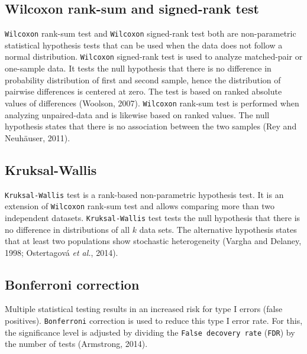 \documentclass[
  parskip,
  openany]{scrreprt}
\begin{document}
\hypertarget{wilcoxon-rank-sum-and-signed-rank-test}{%
\subsection{Wilcoxon rank-sum and signed-rank
test}\label{wilcoxon-rank-sum-and-signed-rank-test}}

\texttt{Wilcoxon} rank-sum test and \texttt{Wilcoxon} signed-rank test
both are non-parametric statistical hypothesis tests that can be used
when the data does not follow a normal distribution. \texttt{Wilcoxon}
signed-rank test is used to analyze matched-pair or one-sample data. It
tests the null hypothesis that there is no difference in probability
distribution of first and second sample, hence the distribution of
pairwise differences is centered at zero. The test is based on ranked
absolute values of differences (Woolson, 2007). \texttt{Wilcoxon}
rank-sum test is performed when analyzing unpaired-data and is likewise
based on ranked values. The null hypothesis states that there is no
association between the two samples (Rey and Neuhäuser, 2011).

\hypertarget{kruksal-wallis}{%
\subsection{Kruksal-Wallis}\label{kruksal-wallis}}

\texttt{Kruksal-Wallis} test is a rank-based non-parametric hypothesis
test. It is an extension of \texttt{Wilcoxon} rank-sum test and allows
comparing more than two independent datasets. \texttt{Kruksal-Wallis}
test tests the null hypothesis that there is no difference in
distributions of all \(k\) data sets. The alternative hypothesis states
that at least two populations show stochastic heterogeneity (Vargha and
Delaney, 1998; Ostertagová \emph{et al.}, 2014).

\hypertarget{bonferroni-correction}{%
\subsection{Bonferroni correction}\label{bonferroni-correction}}

Multiple statistical testing results in an increased risk for type I
errors (false positives). \texttt{Bonferroni} correction is used to
reduce this type I error rate. For this, the significance level is
adjusted by dividing the \texttt{False\ decovery\ rate} (\texttt{FDR})
by the number of tests (Armstrong, 2014).
\end{document}
